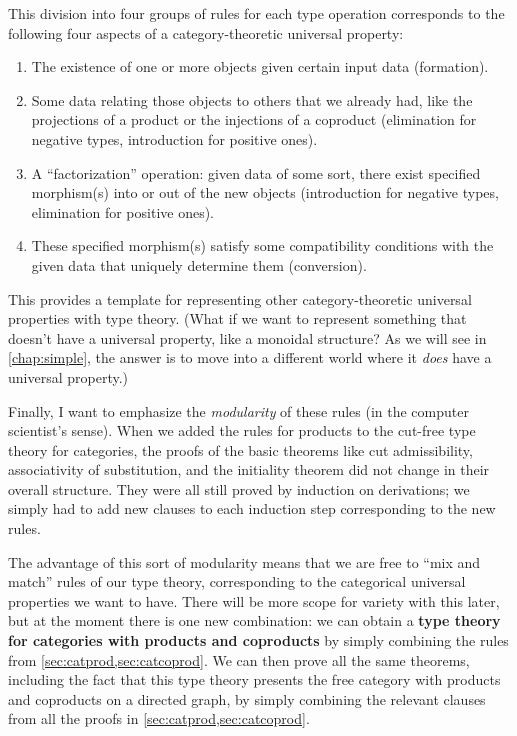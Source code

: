 This division into four groups of rules for each type operation corresponds to the following four aspects of a category-theoretic universal property:
\begin{enumerate}
\item The existence of one or more objects given certain input data (formation).
\item Some data relating those objects to others that we already had, like the projections of a product or the injections of a coproduct (elimination for negative types, introduction for positive ones).
\item A ``factorization'' operation: given data of some sort, there exist specified morphism(s) into or out of the new objects (introduction for negative types, elimination for positive ones).
\item These specified morphism(s) satisfy some compatibility conditions with the given data that uniquely determine them (conversion).
\end{enumerate}
This provides a template for representing other category-theoretic universal properties with type theory.
(What if we want to represent something that doesn't have a universal property, like a monoidal structure?
As we will see in \cref{chap:simple}, the answer is to move into a different world where it \emph{does} have a universal property.)

Finally, I want to emphasize the \emph{modularity} of these rules (in the computer scientist's sense).
When we added the rules for products to the cut-free type theory for categories, the proofs of the basic theorems like cut admissibility, associativity of substitution, and the initiality theorem did not change in their overall structure.
They were all still proved by induction on derivations; we simply had to add new clauses to each induction step corresponding to the new rules.

The advantage of this sort of modularity means that we are free to ``mix and match'' rules of our type theory, corresponding to the categorical universal properties we want to have.
There will be more scope for variety with this later, but at the moment there is one new combination: we can obtain a \textbf{type theory for categories with products and coproducts} by simply combining the rules from \cref{sec:catprod,sec:catcoprod}.
We can then prove all the same theorems, including the fact that this type theory presents the free category with products and coproducts on a directed graph, by simply combining the relevant clauses from all the proofs in \cref{sec:catprod,sec:catcoprod}.


